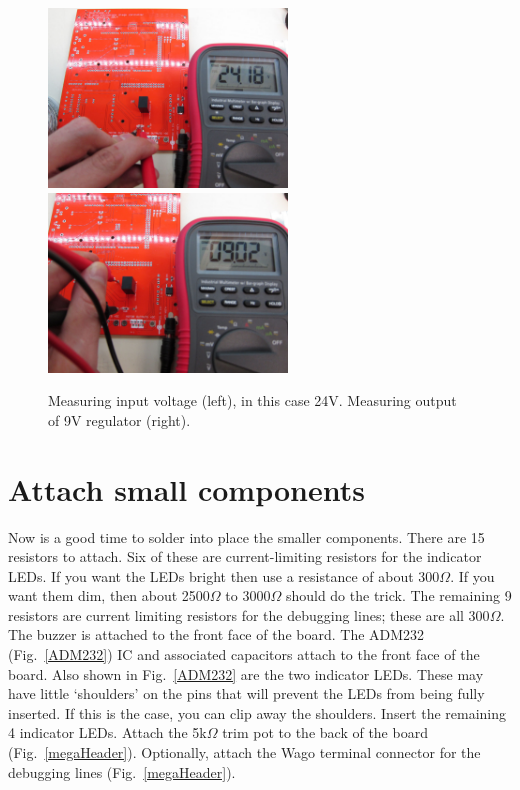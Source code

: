 \documentclass[11pt]{report} %
\begin{document}
\begin{figure}[!ht]
\centering
\includegraphics[width=2.5in]{IMG_3195.JPG}
\includegraphics[width=2.5in]{IMG_3196.JPG}
\caption{Measuring input voltage (left), in this case 24V. Measuring output of 9V regulator (right).}
\label{power}
\end{figure}

\clearpage
\section{Attach small components}
Now is a good time to solder into place the smaller components. There are 15 resistors to attach. Six of these are current-limiting resistors for the indicator LEDs. If you want the LEDs bright then use a resistance of about 300$\Omega$. If you want them dim, then about 2500$\Omega$ to 3000$\Omega$ should do the trick. The remaining 9 resistors are current limiting resistors for the debugging lines; these are all 300$\Omega$. The buzzer is attached to the front face of the board. The ADM232 (Fig.~\ref{ADM232}) IC and associated capacitors attach to the front face of the board. Also shown in Fig.~\ref{ADM232} are the two indicator LEDs. These may have little `shoulders' on the pins that will prevent the LEDs from being fully inserted. If this is the case, you can clip away the shoulders. Insert the remaining 4 indicator LEDs. Attach the 5k$\Omega$ trim pot to the back of the board (Fig.~\ref{megaHeader}). Optionally, attach the Wago terminal connector for the debugging lines (Fig.~\ref{megaHeader}). 
\end{document}
